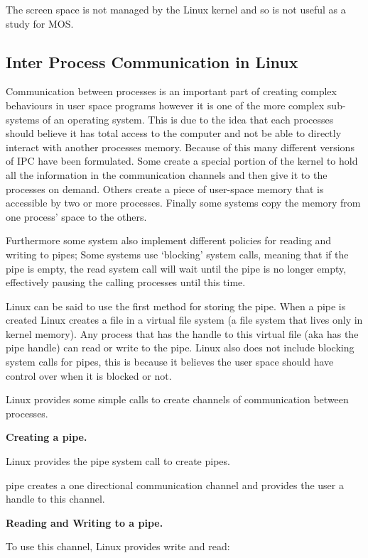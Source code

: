 \documentclass[a4paper]{report}
\begin{document}
The screen space is not managed by the Linux kernel and so is not useful as a study for MOS.

\subsection{Inter Process Communication in Linux}

Communication between processes is an important part of creating complex behaviours in user space programs however it is one of the more complex sub-systems of an operating system. This is due to the idea that each processes should believe it has total access to the computer and not be able to directly interact with another processes memory. Because of this many different versions of IPC have been formulated. Some create a special portion of the kernel to hold all the information in the communication channels and then give it to the processes on demand. Others create a piece of user-space memory that is accessible by two or more processes. Finally some systems copy the memory from one process' space to the others.

Furthermore some system also implement different policies for reading and writing to pipes; Some systems use `blocking' system calls, meaning that if the pipe is empty, the read system call will wait until the pipe is no longer empty, effectively pausing the calling processes until this time.

Linux can be said to use the first method for storing the pipe. When a pipe is created Linux creates a file in a virtual file system (a file system that lives only in kernel memory). Any process that has the handle to this virtual file (aka has the pipe handle) can read or write to the pipe. Linux also does not include blocking system calls for pipes, this is because it believes the user space should have control over when it is blocked or not.

Linux provides some simple calls to create channels of communication between processes.

\noindent
\textbf{Creating a pipe.}

Linux provides the pipe system call to create pipes. \cite{manPipe}

pipe creates a one directional communication channel and provides the user a handle to this channel.

\noindent
\textbf{Reading and Writing to a pipe.}

To use this channel, Linux provides write and read: \cite{manWrite} \cite{manRead}
\end{document}
